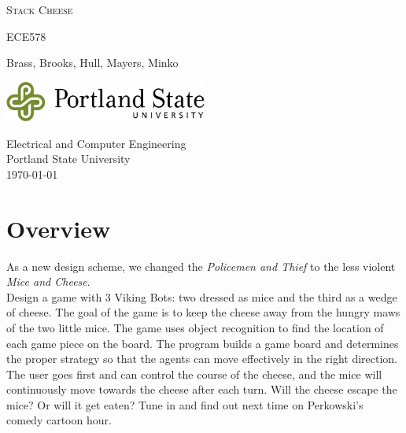 \documentclass[a4paper,12pt]{article}
\newcommand{\authorname}{\footnotesize{Brass}\normalsize{, Brooks, Hull, Mayers, Minko}}
\newcommand{\classnumber}{ECE578}
\newcommand{\projectname}{Stack Cheese}
\begin{document}

\begin{titlepage}
	\begin{center}
		\vspace*{1cm}

		\huge\textsc{\projectname}

		\vspace{0.5cm}
		\small\textsc{\classnumber}
		
		\vspace{1.5cm}
		\normalsize \authorname 
		
		\vspace{0.5cm}
		
		\vfill
		\vspace{0.8cm}
		
		\includegraphics[width=0.5\textwidth]{images/psulogo_horiz_msword.tif}
		
		\vspace{0.5cm}
		Electrical and Computer Engineering\\
		Portland State University\\
		\today
		 
	\end{center}
\end{titlepage}

\newpage
\tableofcontents


\newpage
{}

\section{Overview}
As a new design scheme, we changed the \textit{Policemen and Thief} to the less violent \textit{Mice and Cheese}.\\

Design a game with 3 Viking Bots: two dressed as mice and the third as a wedge of cheese. The goal of the game is to keep the cheese away from the hungry maws of the two little mice. The game uses object recognition to find the location of each game piece on the board. The program builds a game board and determines the proper strategy so that the agents can move effectively in the right direction. The user goes first and can control the course of the cheese, and the mice will continuously move towards the cheese after each turn. Will the cheese escape the mice? Or will it get eaten? Tune in and find out next time on Perkowski’s comedy cartoon hour.
\end{document}
